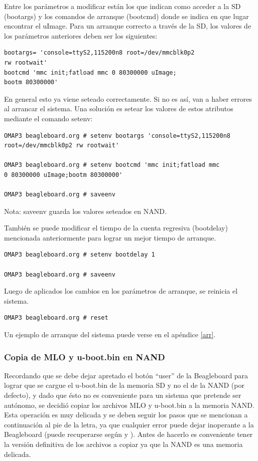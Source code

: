 \bigskip
Entre los parámetros a modificar están los que indican como acceder a la SD (bootargs) y los comandos de arranque (bootcmd) donde se indica en que lugar encontrar el uImage. Para un arranque correcto a través de la SD, los valores de los parámetros anteriores deben ser los siguientes:

\begin{verbatim}
bootargs= 'console=ttyS2,115200n8 root=/dev/mmcblk0p2 
rw rootwait' 
bootcmd 'mmc init;fatload mmc 0 80300000 uImage;
bootm 80300000' 
\end{verbatim}

En general esto ya viene seteado correctamente. Si no es así, van a haber errores al arrancar el sistema. Una solución es setear los valores de estos atributos mediante el comando setenv:

\begin{verbatim}
OMAP3 beagleboard.org # setenv bootargs 'console=ttyS2,115200n8 
root=/dev/mmcblk0p2 rw rootwait' 

OMAP3 beagleboard.org # setenv bootcmd 'mmc init;fatload mmc 
0 80300000 uImage;bootm 80300000' 

OMAP3 beagleboard.org # saveenv 
\end{verbatim}

Nota: saveenv guarda los valores seteados en NAND.

\bigskip
También se puede modificar el tiempo de la cuenta regresiva (bootdelay) mencionada anteriormente para lograr un mejor tiempo de arranque.

\begin{verbatim}
OMAP3 beagleboard.org # setenv bootdelay 1

OMAP3 beagleboard.org # saveenv 
\end{verbatim}

Luego de aplicados los cambios en los parámetros de arranque, se reinicia el sistema.

\begin{verbatim}
OMAP3 beagleboard.org # reset 
\end{verbatim}

Un ejemplo de arranque del sistema puede verse en el apéndice \ref{arr}.

\subsubsection{Copia de MLO y u-boot.bin en NAND}

Recordando que se debe dejar apretado el botón “user” de la Beagleboard para lograr que se cargue el u-boot.bin de la memoria SD y no el de la NAND (por defecto), y dado que ésto no es conveniente para un sistema que pretende ser autónomo, se decidió copiar los archivos MLO y u-boot.bin a la memoria NAND. Esta operación es muy delicada y se deben seguir los pasos que se mencionan a continuación al pie de la letra, ya que cualquier error puede dejar inoperante a la Beagleboard (puede recuperarse según \cite{rec} y \cite{rec1}). Antes de hacerlo es conveniente tener la versión definitiva de los archivos a copiar ya que la NAND es una memoria delicada.

